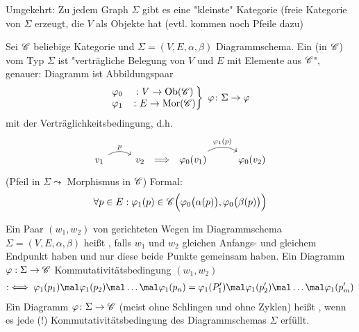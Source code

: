 Umgekehrt: Zu jedem Graph $\Sigma$ gibt es eine "kleinste" Kategorie (freie Kategorie von $\Sigma$ erzeugt, die $V$ als Objekte hat (evtl. kommen noch Pfeile dazu)
\begin{definition}
	Sei $\mathscr C$ beliebige Kategorie und $\Sigma=(V,E,\alpha,\beta)$ Diagrammschema.
	Ein  (in $\mathscr C$) vom Typ $\Sigma$ ist "verträgliche Belegung von $V$ und $E$ mit Elemente aus $\mathscr C$", genauer:
	Diagramm ist Abbildungspaar
	\begin{align*}
	\left.\begin{matrix}
		\varphi_0&\colon V\to\operatorname{Ob}(\mathscr C)\\
		\varphi_1&\colon E\to\operatorname{Mor}(\mathscr C)
	\end{matrix}\right\rbrace~\varphi\colon\Sigma\to\varphi
	\end{align*}
	mit der Verträglichkeitsbedingung, d.h.
	\begin{align*}
		\begin{tikzcd}[ampersand replacement=\&]
v_1 \arrow[r, "p", bend left] \& v_2
\end{tikzcd}\implies
	\begin{tikzcd}[ampersand replacement=\&]
\varphi_0(v_1) \arrow[r, "\varphi_1(p)", bend left] \& \varphi_0(v_2)
\end{tikzcd}
	\end{align*}
	(Pfeil in $\Sigma\leadsto$ Morphismus in $\mathscr C$)
	Formal:
	\begin{align*}
		\forall p\in E:\varphi_1(p)\in\mathscr C\Big(\varphi_0\big(\alpha(p)\big),\varphi_0\big(\beta(p)\big)\Big)
\end{align*}		
	
	Ein Paar $(w_1,w_2)$ von gerichteten Wegen im Diagrammschema $\Sigma=(V,E,\alpha,\beta)$ heißt , falls $w_1$ und $w_2$ gleichen Anfangs- und gleichem Endpunkt haben und nur diese beide Punkte gemeinsam haben.\nl
	Ein Diagramm $\varphi:\Sigma\to\mathscr C$  Kommutativitätsbedingung $(w_1,w_2)$
	\begin{align*}
		:\iff\varphi_1(p_1)\mal\varphi_1(p_2)\mal\ldots\mal\varphi_1(p_n)
		=\varphi_1(P_1')\mal\varphi_1(p_2')\mal\ldots\mal\varphi_1(p_m')
	\end{align*}
	Ein Diagramm $\varphi\colon\Sigma\to\mathscr C$ (meist ohne Schlingen und ohne Zyklen) heißt , wenn es jede (!) Kommutativitätsbedingung des Diagrammschemas $\Sigma$ erfüllt.
\end{definition}

